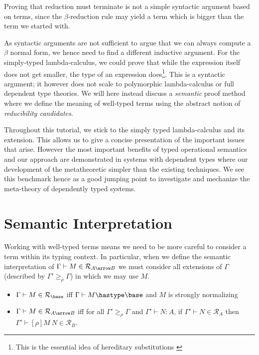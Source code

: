 \documentclass{article}
\newcommand{\ext}[1]{\geq_{#1}}
\newcommand{\SN}{\mathsf{SN}}
\newcommand{\denot}[1]{\mathcal{R}_{#1}}
\newcommand{\inden}[3]{#1 \vdash #2 \in \denot{#3}}
\begin{document}
Proving that reduction must terminate is not a simple syntactic argument based on terms, since the $\beta$-reduction rule may yield a term which is bigger than the term we started with. %

As syntactic arguments are not sufficient to argue that we can always compute a $\beta$ normal form, we hence need to find a different inductive argument. For the simply-typed lambda-calculus, we could prove that while the expression itself does not get smaller,  the type of an expression does\footnote{This is the essential idea of hereditary substitutions \cite{Watkins02tr}}.  This is a syntactic argument; it however does not scale to polymorphic lambda-calculus or full dependent type theories. We will here instead discuss a \emph{semantic} proof method where we define the meaning of well-typed terms using the abstract notion of \emph{reducibility candidates}.

Throughout this tutorial, we stick to the simply typed lambda-calculus and its extension. This allows us to give a concise presentation of the important issues that arise.  However the most important benefits of typed operational semantics and our approach are demonstrated in systems with dependent types  where our development of the metatheoretic simpler than the existing techniques. We see this benchmark hence as a good jumping point to investigate and mechanize the meta-theory of dependently typed systems.



\section{Semantic Interpretation}
Working with well-typed terms means we need to be more careful to
consider a term within its typing context. In particular, when we
define the semantic interpretation of $\inden{\Gamma}{M}{A \arrow B}$
we must consider all extensions of $\Gamma$ (described by $\Gamma'
\ext \rho \Gamma$) in which we may use $M$.

\begin{itemize}
\item $\inden{\Gamma}{M}{\base}$ iff $\Gamma \vdash M\hastype \base$ and $M$ is strongly normalizing
\item $\inden{\Gamma}{M}{A \arrow B}$ iff for all $\Gamma' \ext{\rho} \Gamma$ and $\Gamma' \vdash N :A$, if $\inden{\Gamma'}{N}{A}$ then $\inden{\Gamma'}{[\rho]M~N}{B}$.
\end{itemize}
\end{document}
